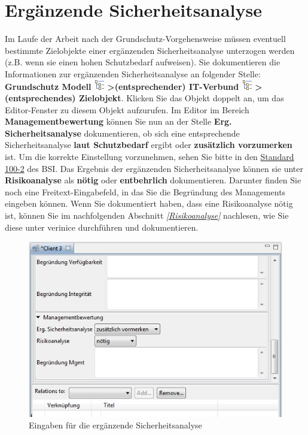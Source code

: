 \documentclass[a4paper,10pt]{book}
\begin{document}
\section{Ergänzende Sicherheitsanalyse}
Im Laufe der Arbeit nach der Grundschutz-Vorgehensweise müssen eventuell bestimmte Zielobjekte einer ergänzenden Sicherheitsanalyse unterzogen werden
(z.B. wenn sie einen hohen Schutzbedarf aufweisen). Sie dokumentieren die Informationen zur ergänzenden Sicherheitsanalyse an folgender Stelle:
\textbf{Grundschutz Modell \includegraphics[height=2ex]{Icon/GS_Modell.png} \textgreater (entsprechender) IT-Verbund
\includegraphics[height=2ex]{Icon/GS_Modell.png} \textgreater (entsprechendes) Zielobjekt}. Klicken Sie das Objekt doppelt an, um das Editor-Fenster zu diesem
Objekt aufzurufen. Im Editor im Bereich \textbf{Managementbewertung} können Sie nun  an der Stelle \textbf{Erg. Sicherheitsanalyse}
dokumentieren, ob sich eine entsprechende Sicherheitsanalyse \textbf{laut Schutzbedarf} ergibt oder \textbf{zusätzlich vorzumerken} ist. Um die korrekte
Einstellung vorzunehmen, sehen Sie bitte in den \href{https://www.bsi.bund.de/DE/Themen/ITGrundschutz/ITGrundschutzStandards/ITGrundschutzStandards_node.html#doc471418bodyText2}{Standard 100-2}
des BSI. Das Ergebnis der ergänzenden Sicherheitsanalyse können sie unter \textbf{Risikoanalyse} als \textbf{nötig} oder \textbf{entbehrlich} dokumentieren.
Darunter finden Sie noch eine Freitext-Eingabefeld, in das Sie die Begründung des Managements eingeben können. Wenn Sie dokumentiert haben, dass eine
Risikoanalyse nötig ist, können Sie im nachfolgenden Abschnitt {\em \ref{Risikoanalyse} } nachlesen, wie Sie diese unter verinice durchführen und dokumentieren.
\newline
\begin{figure}[htb!]
  \centering
  \includegraphics[scale=.6]{Screenshot/Sicherheitsanalyse.jpg}
  \caption{\label{Eingaben fuer die ergaenzende Sicherheitsanalyse} Eingaben für die ergänzende Sicherheitsanalyse}
\end{figure}
\newline
\end{document}
